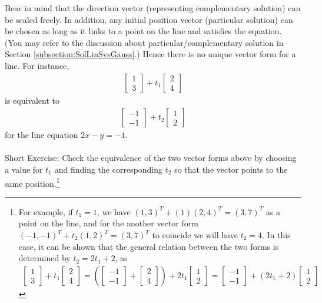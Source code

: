 Bear in mind that the direction vector (representing complementary solution) can be scaled freely. In addition, any initial position vector (particular solution) can be chosen as long as it links to a point on the line and satisfies the equation. (You may refer to the discussion about particular/complementary solution in Section \ref{subsection:SolLinSysGauss}.) Hence there is no unique vector form for a line. For instance,
\begin{align*}
\begin{bmatrix}
1\\
3
\end{bmatrix}
+ t_1
\begin{bmatrix}
2 \\
4
\end{bmatrix}     
\end{align*}
is equivalent to
\begin{align*}
\begin{bmatrix}
-1\\
-1
\end{bmatrix}
+ t_2
\begin{bmatrix}
1 \\
2
\end{bmatrix}     
\end{align*}
for the line equation $2x - y = -1$.\\
\\
Short Exercise: Check the equivalence of the two vector forms above by choosing a value for $t_1$ and finding the corresponding $t_2$ so that the vector points to the same position.\footnote{For example, if $t_1 = 1$, we have $(1, 3)^T + (1)(2, 4)^T = (3 ,7)^T$ as a point on the line, and for the another vector form $(-1,-1)^T + t_2(1, 2)^T = (3 ,7)^T$ to coincide we will have $t_2 = 4$. In this case, it can be shown that the general relation between the two forms is determined by $t_2 = 2t_1 + 2$, as
\begin{align*}
\begin{bmatrix}
1\\
3
\end{bmatrix}
+ t_1
\begin{bmatrix}
2 \\
4
\end{bmatrix}
=
\left(
\begin{bmatrix}
-1\\
-1
\end{bmatrix}
+
\begin{bmatrix}
2 \\
4
\end{bmatrix}
\right)
+ 2t_1
\begin{bmatrix}
1 \\
2
\end{bmatrix}
=
\begin{bmatrix}
-1\\
-1
\end{bmatrix}
+ (2t_1+2)
\begin{bmatrix}
1 \\
2
\end{bmatrix}
\end{align*}}\\
